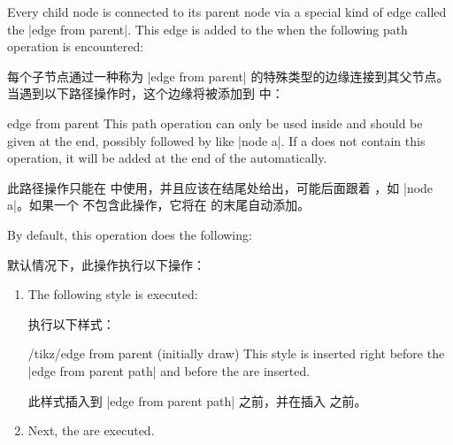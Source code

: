 Every child node is connected to its parent node via a special kind of edge
called the |edge from parent|. This edge is added to the  when
the following path operation is encountered:

每个子节点通过一种称为 |edge from parent| 的特殊类型的边缘连接到其父节点。当遇到以下路径操作时，这个边缘将被添加到  中：

\begin{pathoperation}{edge from parent}{}
    This path operation can only be used inside  and should
    be given at the end, possibly followed by  like
    |node {a}|. If a  does not contain this operation, it will
    be added at the end of the  automatically.

    此路径操作只能在  中使用，并且应该在结尾处给出，可能后面跟着 ，如 |node {a}|。如果一个  不包含此操作，它将在  的末尾自动添加。

    By default, this operation does the following:
    
    默认情况下，此操作执行以下操作：

    \begin{enumerate}
        \item The following style is executed:
            
        执行以下样式：


            \begin{stylekey}{/tikz/edge from parent (initially draw)}
                This style is inserted right before the |edge from parent path|
                and before the  are inserted.
                
                此样式插入到 |edge from parent path| 之前，并在插入  之前。


\begin{codeexample}[]
\end{codeexample}
            \end{stylekey}
        \item Next, the  are executed.


\end{enumerate}
\end{pathoperation}
